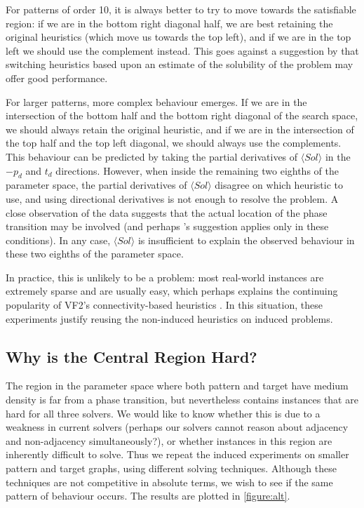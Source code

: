 \documentclass[letterpaper]{article}
\newcommand{\citet}[1]{\citeauthor{#1} \shortcite{#1}}
\newcommand{\citep}[1]{\cite{#1}}
\begin{document}
For patterns of order 10, it is always better to try to move towards the satisfiable region: if we
are in the bottom right diagonal half, we are best retaining the original heuristics (which move us
towards the top left), and if we are in the top left we should use the complement instead. This
goes against a suggestion by \citet{Walsh:1998} that switching heuristics based upon an estimate of
the solubility of the problem may offer good performance.

For larger patterns, more complex behaviour emerges. If we are in the intersection of the bottom half
and the bottom right diagonal of the search space, we should always retain the original heuristic,
and if we are in the intersection of the top half and the top left diagonal, we should always use
the complements. This behaviour can be predicted by taking the partial derivatives of $\langle Sol
\rangle$ in the $-p_d$ and $t_d$ directions.  However, when inside the remaining two eighths of the
parameter space, the partial derivatives of $\langle Sol \rangle$ disagree on which heuristic to
use, and using directional derivatives is not enough to resolve the problem. A close observation of
the data suggests that the actual location of the phase transition may be involved (and perhaps
\citeauthor{Walsh:1998}'s suggestion applies only in these conditions). In any case, $\langle Sol
\rangle$ is insufficient to explain the observed behaviour in these two eighths of the parameter space.

In practice, this is unlikely to be a problem: most real-world instances are extremely sparse and
are usually easy, which perhaps explains the continuing popularity of VF2's connectivity-based
heuristics \citep{Carletti:2015}. In this situation, these experiments justify reusing the
non-induced heuristics on induced problems.

\subsection{Why is the Central Region Hard?}

The region in the parameter space where both pattern and target have medium density is far from a
phase transition, but nevertheless contains instances that are hard for all three solvers. We would
like to know whether this is due to a weakness in current solvers (perhaps our solvers cannot reason
about adjacency and non-adjacency simultaneously?), or whether instances in this region are
inherently difficult to solve.  Thus we repeat the induced experiments on smaller pattern and target
graphs, using different solving techniques.  Although these techniques are not competitive in
absolute terms, we wish to see if the same pattern of behaviour occurs. The results are plotted in
\cref{figure:alt}.
\end{document}
